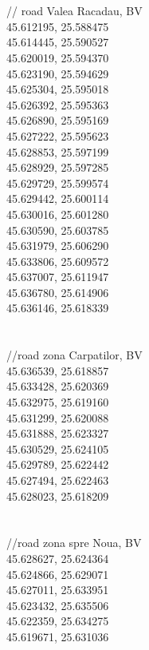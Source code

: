 \documentclass {article}
\begin{document}
\begin{appendices}
\\
\\
// road Valea Racadau, BV\\
45.612195, 25.588475\\
45.614445, 25.590527\\
45.620019, 25.594370\\
45.623190, 25.594629\\
45.625304, 25.595018\\
45.626392, 25.595363\\
45.626890, 25.595169\\
45.627222, 25.595623\\
45.628853, 25.597199\\
45.628929, 25.597285\\
45.629729, 25.599574\\
45.629442, 25.600114\\
45.630016, 25.601280\\
45.630590, 25.603785\\
45.631979, 25.606290\\
45.633806, 25.609572\\
45.637007, 25.611947\\
45.636780, 25.614906\\
45.636146, 25.618339\\
\\
\\
//road zona Carpatilor, BV\\
45.636539, 25.618857\\
45.633428, 25.620369\\
45.632975, 25.619160\\
45.631299, 25.620088\\
45.631888, 25.623327\\
45.630529, 25.624105\\
45.629789, 25.622442\\
45.627494, 25.622463\\
45.628023, 25.618209\\
\\
\\
//road zona spre Noua, BV\\
45.628627, 25.624364\\
45.624866, 25.629071\\
45.627011, 25.633951\\
45.623432, 25.635506\\
45.622359, 25.634275\\
45.619671, 25.631036\\

\end{appendices}
\end{document}
